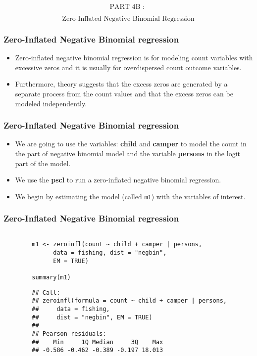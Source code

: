 \documentclass[MASTER.tex]{subfiles}
\begin{document}
\begin{frame}
	\LARGE
	
	\[  \mbox{PART 4B : } \]
		
	\[  \mbox{Zero-Inflated Negative Binomial Regression} \]
	

\end{frame}
\begin{frame}
\frametitle{Zero-Inflated Negative Binomial regression}	
\large
\begin{itemize} 
\item Zero-inflated negative binomial regression is for modeling count variables with excessive zeros and it is usually for overdispersed count outcome variables. 
\item Furthermore, theory suggests that the excess zeros are generated by a separate process from the count values and that the excess zeros can be modeled independently.
\end{itemize}
\end{frame}
	\begin{frame}
	\Large
		\frametitle{Zero-Inflated Negative Binomial regression}
\begin{itemize}
\item  We are going to use the variables: \textbf{child} and \textbf{camper} to model the count in the part of negative binomial model and the variable \textbf{persons} in the logit part of the model. 
\item We use the \textbf{pscl} to run a zero-inflated negative binomial regression. 
\item We begin by estimating the model (called \texttt{m1}) with the variables of interest.
\end{itemize}	
		

\end{frame}
\begin{frame}[fragile]
\frametitle{Zero-Inflated Negative Binomial regression}	
\large
\begin{verbatim}
		
		m1 <- zeroinfl(count ~ child + camper | persons,
			  data = fishing, dist = "negbin", 
			  EM = TRUE)
		
		summary(m1)
\end{verbatim}
\end{frame}
\begin{frame}[fragile]
	\begin{verbatim}
		## Call:
		## zeroinfl(formula = count ~ child + camper | persons, 
		##     data = fishing, 
		##     dist = "negbin", EM = TRUE)
		## 
		## Pearson residuals:
		##    Min     1Q Median     3Q    Max 
		## -0.586 -0.462 -0.389 -0.197 18.013 
\end{verbatim}
\end{frame}
\end{document}
